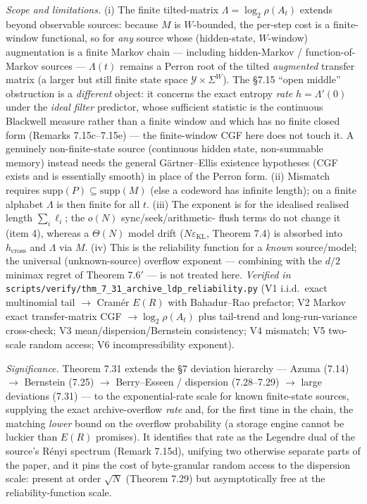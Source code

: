 \documentclass[
]{article}
\begin{document}
\emph{Scope and limitations.} (i) The finite tilted-matrix $\Lambda=\log_2\rho(A_t)$
extends beyond observable sources: because $M$ is $W$-bounded, the per-step cost is a
finite-window functional, so for \emph{any} source whose (hidden-state, $W$-window)
augmentation is a finite Markov chain --- including hidden-Markov / function-of-Markov
sources --- $\Lambda(t)$ remains a Perron root of the tilted \emph{augmented} transfer
matrix (a larger but still finite state space $\mathcal Y\times\Sigma^W$). The §7.15
``open middle'' obstruction is a \emph{different} object: it concerns the exact entropy
\emph{rate} $h=\Lambda'(0)$ under the \emph{ideal filter} predictor, whose sufficient
statistic is the continuous Blackwell measure rather than a finite window and which has
no finite closed form (Remarks 7.15c--7.15e) --- the finite-window CGF here does not
touch it. A genuinely non-finite-state source (continuous hidden state, non-summable
memory) instead needs the general G\"artner--Ellis existence hypotheses (CGF exists and
is essentially smooth) in place of the Perron form. (ii) Mismatch requires
$\mathrm{supp}(P)\subseteq\mathrm{supp}(M)$ (else a codeword has infinite length);
on a finite alphabet $\Lambda$ is then finite for all $t$. (iii) The exponent is
for the idealised realised length $\sum_i\ell_i$; the $o(N)$ sync/seek/arithmetic-
flush terms do not change it (item 4), whereas a $\Theta(N)$ model drift
($N\varepsilon_{\mathrm{KL}}$, Theorem 7.4) is absorbed into $h_{\mathrm{cross}}$ and
$\Lambda$ via $M$. (iv) This is the reliability function for a \emph{known}
source/model; the universal (unknown-source) overflow exponent --- combining with
the $d/2$ minimax regret of Theorem 7.6$'$ --- is not treated here. \emph{Verified
in} \texttt{scripts/verify/thm\_7\_31\_archive\_ldp\_reliability.py} (V1 i.i.d.\
exact multinomial tail $\to$ Cram\'er $E(R)$ with Bahadur--Rao prefactor; V2 Markov
exact transfer-matrix CGF $\to\log_2\rho(A_t)$ plus tail-trend and long-run-variance
cross-check; V3 mean/dispersion/Bernstein consistency; V4 mismatch; V5 two-scale
random access; V6 incompressibility exponent).

\emph{Significance.} Theorem 7.31 extends the §7 deviation hierarchy --- Azuma
(7.14) $\to$ Bernstein (7.25) $\to$ Berry--Esseen / dispersion (7.28--7.29) $\to$
large deviations (7.31) --- to the exponential-rate scale for known finite-state
sources, supplying the exact archive-overflow \emph{rate} and, for the first time in
the chain, the matching \emph{lower} bound on the overflow probability (a storage
engine cannot be luckier than $E(R)$ promises). It
identifies that rate as the Legendre dual of the source's R\'enyi spectrum
(Remark 7.15d), unifying two otherwise separate parts of the paper, and it pins the
cost of byte-granular random access to the dispersion scale: present at order
$\sqrt N$ (Theorem 7.29) but asymptotically free at the reliability-function scale.
\end{document}
